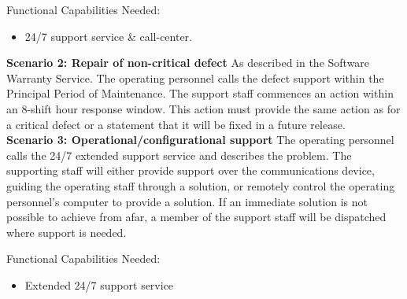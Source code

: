 \noindent Functional Capabilities Needed:
\begin{itemize}
	\item 24/7 support service \& call-center.
\end{itemize}

\vspace{20pt}
\noindent \textbf{Scenario 2: Repair of non-critical defect}
As described in the Software Warranty Service.
The operating personnel calls the defect support within the Principal Period of Maintenance. The support staff commences an action within an 8-shift hour response window. This action must provide the same action as for a critical defect or a statement that it will be fixed in a future release. \\

\vspace{20pt}
\noindent \textbf{Scenario 3: Operational/configurational support}
The operating personnel calls the 24/7 extended support service and describes the problem. The supporting staff will either provide support over the communications device, guiding the operating staff through a solution, or remotely control the operating personnel’s computer to provide a solution. If an immediate solution is not possible to achieve from afar, a member of the support staff will be dispatched where support is needed. 

\noindent Functional Capabilities Needed:
\begin{itemize}
	\item Extended 24/7 support service
\end{itemize}














